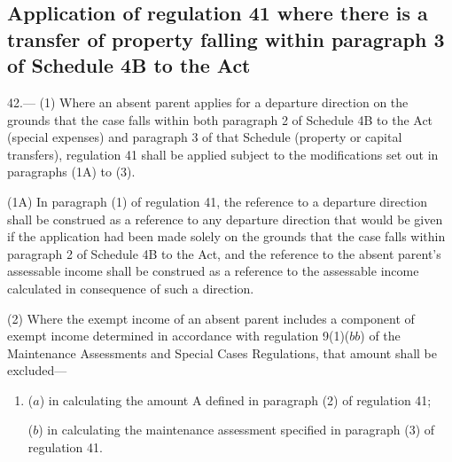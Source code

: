 \documentclass[12pt,a4paper]{article}
\begin{document}
\subsection[42. Application of regulation 41 where there is a transfer of property falling
within paragraph 3 of Schedule 4B to the Act]{Application of regulation 41 where there is a transfer of property falling
within paragraph 3 of Schedule 4B to the Act}

42.—%
%
(1) Where an absent parent applies for a departure direction on the grounds that the case falls within both paragraph 2 of Schedule 4B to the Act (special expenses) and paragraph 3 of that Schedule (property or capital transfers), regulation 41 shall be applied subject to the modifications set out in paragraphs (1A) to (3).

(1A) In paragraph (1) of regulation 41, the reference to a departure direction shall be construed as a reference to any departure direction that would be given if the application had been made solely on the grounds that the case falls within paragraph 2 of Schedule 4B to the Act, and the reference to the absent parent’s assessable income shall be construed as a reference to the assessable income calculated in consequence of such a direction.

(2) Where the exempt income of an absent parent includes a component of exempt
income determined in accordance with regulation 9(1)($bb$) of the Maintenance
Assessments and Special Cases Regulations, that amount shall be excluded—
\begin{enumerate}\item[]
($a$) in calculating the amount A defined in paragraph (2) of regulation 41;

($b$) in calculating the maintenance assessment specified in paragraph (3) of
regulation 41.
\end{enumerate}

\end{document}

